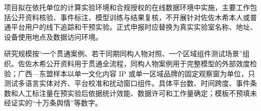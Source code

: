 \GXNSFBodyText

项目拟在依托单位的计算实验环境和合规授权的在线数据环境中实施，主要工作包括公开资料核验、事件标注、模型训练与结果复核，不开展针对佐佐木希本人或普通平台用户的线下追踪和干预实验。正式申报时应替换为真实实验室名称、地址、设备使用地点及数据访问环境。

研究规模按“一个贯通案例、若干同期同构人物对照、一个区域组件测试场景”组织。佐佐木希公开资料用于贯通全流程，同构人物案例用于完整模型的外部效度检验；广西—东盟样本以单一文化内容 IP 或单一区域品牌的固定观察窗为单位，只测试多语言实体对齐、平台校准和扰动窗口组件。具体平台数、时间跨度、事件条数和人工标注量在预实验后依据统计效能、数据许可和工作量确定；模板不预填未经证实的“十万条舆情”等数字。
